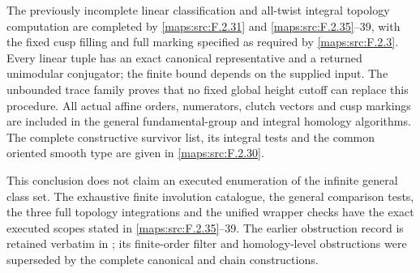 \begin{proposition}\label{maps:src:F.2.4}


The previously incomplete linear classification and all-twist
integral topology computation are completed by \ref{maps:src:F.2.31} and
\ref{maps:src:F.2.35}--39, with the fixed cusp filling and full marking
specified as required by \ref{maps:src:F.2.3}.  Every linear tuple has an
exact canonical representative and a returned unimodular
conjugator; the finite bound depends on the supplied input.
The unbounded trace family proves that no fixed global
height cutoff can replace this procedure.  All actual affine
orders, numerators, clutch vectors and cusp markings are
included in the general fundamental-group and integral
homology algorithms.  The complete constructive survivor
list, its integral tests and the common oriented smooth
type are given in \ref{maps:src:F.2.30}.

This conclusion does not claim an executed enumeration of
the infinite general class set.  The exhaustive finite
involution catalogue, the general comparison tests, the
three full topology integrations and the unified wrapper
checks have the exact executed scopes stated in \ref{maps:src:F.2.35}--39.
The earlier obstruction record is retained verbatim in
; its finite-order
filter and homology-level obstructions were superseded by
the complete canonical and chain constructions.


\end{proposition}
